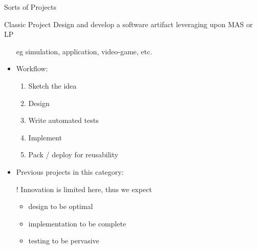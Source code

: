 \documentclass[presentation]{beamer}\mode<presentation>{\usetheme{AMSBolognaFC}}
\begin{document}
\begin{frame}[c, allowframebreaks]{Sorts of Projects}

    \begin{block}{Classic \courseAcronym{} Project}
        Design and develop a software artifact leveraging upon MAS or LP
        \begin{itemize}
            \item[eg] simulation, application, video-game, etc.
            \item Workflow:
            \vspace{-10pt}
            \begin{multicols}{2}
				\begin{enumerate}
					\item Sketch the idea
					\item Design
					\item Write \alert{automated} tests
					\item Implement
					\item Pack / deploy for reusability
				\end{enumerate}
			\end{multicols}
            \item Previous projects in this category: 
            \item[!] Innovation is limited here, thus we expect
            \begin{itemize}
                \item design to be optimal
				\item implementation to be complete
				\item testing to be pervasive
            \end{itemize}
        \end{itemize}
    \end{block}


\end{frame}
\end{document}
